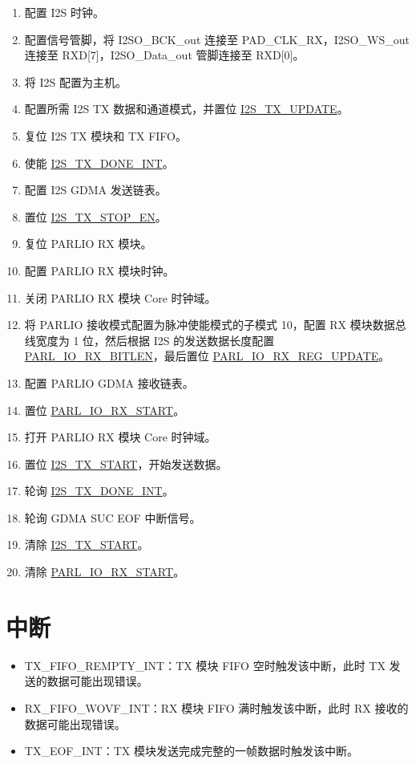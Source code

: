 \documentclass[main\_\_CN.tex]{subfiles}
\begin{document}
\begin{enumerate}
    \item 配置 I2S 时钟。
    \item 配置信号管脚，将 I2SO\_BCK\_out 连接至 PAD\_CLK\_RX，I2SO\_WS\_out 连接至 RXD[7]，I2SO\_Data\_out 管脚连接至 RXD[0]。
    \item 将 I2S 配置为主机。
    \item 配置所需 I2S TX 数据和通道模式，并置位 \hyperref[fielddesc:I2STXUPDATE]{I2S\_TX\_UPDATE}。
    \item 复位 I2S TX 模块和 TX FIFO。
    \item 使能 \hyperref[int:I2STXDONEINT]{I2S\_TX\_DONE\_INT}。 
    \item 配置 I2S GDMA 发送链表。
    \item 置位 \hyperref[fielddesc:I2STXSTOPEN]{I2S\_TX\_STOP\_EN}。
    \item 复位 PARLIO RX 模块。
    \item 配置 PARLIO RX 模块时钟。
    \item 关闭 PARLIO RX 模块 Core 时钟域。
    \item 将 PARLIO 接收模式配置为脉冲使能模式的子模式 10，配置 RX 模块数据总线宽度为 1 位，然后根据 I2S 的发送数据长度配置 \hyperref[fielddesc:PARLIORXBITLEN]{PARL\_IO\_RX\_BITLEN}，最后置位 \hyperref[fielddesc:PARLIORXREGUPDATE]{PARL\_IO\_RX\_REG\_UPDATE}。
    \item 配置 PARLIO GDMA 接收链表。
    \item 置位 \hyperref[fielddesc:PARLIORXSTART]{PARL\_IO\_RX\_START}。
    \item 打开 PARLIO RX 模块 Core 时钟域。
    \item 置位 \hyperref[fielddesc:I2STXSTART]{I2S\_TX\_START}，开始发送数据。
    \item 轮询 \hyperref[int:I2STXDONEINT]{I2S\_TX\_DONE\_INT}。 
    \item 轮询 GDMA SUC EOF 中断信号。
    \item 清除 \hyperref[fielddesc:I2STXSTART]{I2S\_TX\_START}。
    \item 清除 \hyperref[fielddesc:PARLIORXSTART]{PARL\_IO\_RX\_START}。
\end{enumerate}


\section{中断} \label{sec:parlio-interrupts}


\begin{itemize}
\item \label{int:TXFIFOREMPTYINT}TX\_FIFO\_REMPTY\_INT：TX 模块 FIFO 空时触发该中断，此时 TX 发送的数据可能出现错误。
\item \label{int:RXFIFOWOVFINT}RX\_FIFO\_WOVF\_INT：RX 模块 FIFO 满时触发该中断，此时 RX 接收的数据可能出现错误。
\item \label{int:TXEOFINT}TX\_EOF\_INT：TX 模块发送完成完整的一帧数据时触发该中断。
\end{itemize}
\end{document}
